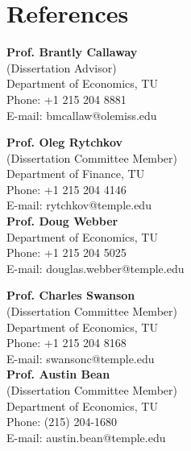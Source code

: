 \documentclass[12pt,letterpaper]{article}
\begin{document}
\section*{References}
\vspace{-.15in}
\begin{multicols}{2}
	
	\textbf{Prof. Brantly Callaway} \\
	(Dissertation Advisor)\\
	Department of Economics, TU \\
	\hfill {Phone: +1 215 204 8881}\\
	\hfill{E-mail: {\color{blue}bmcallaw@olemiss.edu}}
	
	\vspace{.2in}
	
	\textbf{Prof. Oleg Rytchkov}\\
	(Dissertation Committee Member)\\
	Department of Finance, TU\\
	\hfill Phone: +1 215 204 4146\\
	\hfill{E-mail: {\color{blue}rytchkov@temple.edu}}\\

\textbf{Prof. Doug Webber} \\
Department of Economics, TU \\
\hfill{Phone: +1 215 204 5025} \\
\hfill{E-mail: {\color{blue}douglas.webber@temple.edu}}\\

		\columnbreak
		
		\textbf{Prof. Charles Swanson} \\
	(Dissertation Committee Member)\\
	Department of Economics, TU \\
	\hfill {Phone: +1 215 204 8168}\\
	\hfill{E-mail: {\color{blue}swansonc@temple.edu}}\\
	
	\vspace{.2in}
	\textbf{Prof. Austin Bean} \\
	(Dissertation Committee Member)\\
	Department of Economics, TU \\
	\hfill {Phone: (215) 204-1680}\\
	\hfill{E-mail: {\color{blue}austin.bean@temple.edu}}\\	



\end{multicols}
\end{document}
